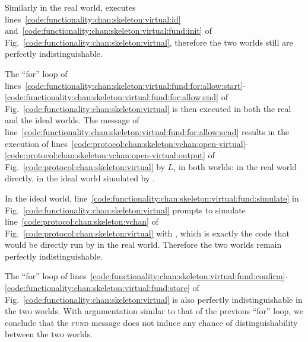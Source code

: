   Similarly in the real world, \alice executes
  lines~\ref{code:functionality:chan:skeleton:virtual:id}
  and~\ref{code:functionality:chan:skeleton:virtual:fund:init} of
  Fig.~\ref{code:functionality:chan:skeleton:virtual}, therefore the two
  worlds still are perfectly indistinguishable.

  The ``for'' loop of
  lines~\ref{code:functionality:chan:skeleton:virtual:fund:for:allow:start}-\ref{code:functionality:chan:skeleton:virtual:fund:for:allow:end}
  of Fig.~\ref{code:functionality:chan:skeleton:virtual} is then executed in
  both the real and the ideal worlds. The message of
  line~\ref{code:functionality:chan:skeleton:virtual:fund:for:allow:send}
  results in the execution of
  lines~\ref{code:protocol:chan:skeleton:vchan:open-virtual}-\ref{code:protocol:chan:skeleton:vchan:open-virtual:output}
  of Fig.~\ref{code:protocol:chan:skeleton:virtual} by $L_i$ in both worlds: in
  the real world directly, in the ideal world simulated by \simulator.

  In the ideal world,
  line~\ref{code:functionality:chan:skeleton:virtual:fund:simulate} in
  Fig.~\ref{code:functionality:chan:skeleton:virtual} prompts \simulator to
  simulate line~\ref{code:protocol:chan:skeleton:vchan} of
  Fig.~\ref{code:protocol:chan:skeleton:virtual} with \alice, which is exactly
  the code that would be directly run by \alice in the real world. Therefore the
  two worlds remain perfectly indistinguishable.

  The ``for'' loop of
  lines~\ref{code:functionality:chan:skeleton:virtual:fund:confirm}-\ref{code:functionality:chan:skeleton:virtual:fund:store}
  of Fig.~\ref{code:functionality:chan:skeleton:virtual} is also perfectly
  indistinguishable in the two worlds. With argumentation similar to that of the
  previous ``for'' loop, we conclude that the \textsc{fund} message does not
  induce any chance of distinguishability between the two worlds.

